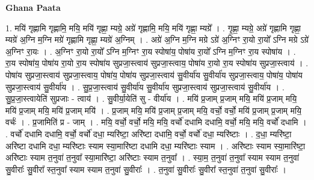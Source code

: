 \documentclass[17pt]{extarticle}
\begin{document}
\textbf{Ghana Paata } \newline

1. मयि॑ गृह्णामि गृह्णामि॒ मयि॒ मयि॑ गृह्णा॒ म्यग्रे॒ अग्रे॑ गृह्णामि॒ मयि॒ मयि॑ गृह्णा॒ म्यग्रे᳚ । . गृ॒ह्णा॒ म्यग्रे॒ अग्रे॑ गृह्णामि गृह्णा॒ म्यग्रे॑ अ॒ग्नि म॒ग्नि मग्रे॑ गृह्णामि गृह्णा॒ म्यग्रे॑ अ॒ग्निम् । . अग्रे॑ अ॒ग्नि म॒ग्नि मग्रे ऽग्रे॑ अ॒ग्निꣳ रा॒यो रा॒यो᳚ ऽग्नि मग्रे ऽग्रे॑ अ॒ग्निꣳ रा॒यः । . अ॒ग्निꣳ रा॒यो रा॒यो᳚ ऽग्नि म॒ग्निꣳ रा॒य स्पोषा॑य॒ पोषा॑य रा॒यो᳚ ऽग्नि म॒ग्निꣳ रा॒य स्पोषा॑य । . रा॒य स्पोषा॑य॒ पोषा॑य रा॒यो रा॒य स्पोषा॑य सुप्रजा॒स्त्वाय॑ सुप्रजा॒स्त्वाय॒ पोषा॑य रा॒यो रा॒य स्पोषा॑य सुप्रजा॒स्त्वाय॑ । . पोषा॑य सुप्रजा॒स्त्वाय॑ सुप्रजा॒स्त्वाय॒ पोषा॑य॒ पोषा॑य सुप्रजा॒स्त्वाय॑ सु॒वीर्या॑य सु॒वीर्या॑य सुप्रजा॒स्त्वाय॒ पोषा॑य॒ पोषा॑य सुप्रजा॒स्त्वाय॑ सु॒वीर्या॑य । . सु॒प्र॒जा॒स्त्वाय॑ सु॒वीर्या॑य सु॒वीर्या॑य सुप्रजा॒स्त्वाय॑ सुप्रजा॒स्त्वाय॑ सु॒वीर्या॑य । . सु॒प्र॒जा॒स्त्वायेति॑ सुप्रजाः - त्वाय॑ । . सु॒वीर्या॒येति॑ सु - वीर्या॑य । . मयि॑ प्र॒जाम् प्र॒जाम् मयि॒ मयि॑ प्र॒जाम् मयि॒ मयि॑ प्र॒जाम् मयि॒ मयि॑ प्र॒जाम् मयि॑ । . प्र॒जाम् मयि॒ मयि॑ प्र॒जाम् प्र॒जाम् मयि॒ वर्चो॒ वर्चो॒ मयि॑ प्र॒जाम् प्र॒जाम् मयि॒ वर्चः॑ । . प्र॒जामिति॑ प्र - जाम् । . मयि॒ वर्चो॒ वर्चो॒ मयि॒ मयि॒ वर्चो॑ दधामि दधामि॒ वर्चो॒ मयि॒ मयि॒ वर्चो॑ दधामि । . वर्चो॑ दधामि दधामि॒ वर्चो॒ वर्चो॑ दधा॒ म्यरि॑ष्टा॒ अरि॑ष्टा दधामि॒ वर्चो॒ वर्चो॑ दधा॒ म्यरि॑ष्टाः । . द॒धा॒ म्यरि॑ष्टा॒ अरि॑ष्टा दधामि दधा॒ म्यरि॑ष्टाः स्याम स्या॒मारि॑ष्टा दधामि दधा॒ म्यरि॑ष्टाः स्याम । . अरि॑ष्टाः स्याम स्या॒मारि॑ष्टा॒ अरि॑ष्टाः स्याम त॒नुवा॑ त॒नुवा᳚ स्या॒मारि॑ष्टा॒ अरि॑ष्टाः स्याम त॒नुवा᳚ । . स्या॒म॒ त॒नुवा॑ त॒नुवा᳚ स्याम स्याम त॒नुवा॑ सु॒वीराः᳚ सु॒वीरा᳚ स्त॒नुवा᳚ स्याम स्याम त॒नुवा॑ सु॒वीराः᳚ । . त॒नुवा॑ सु॒वीराः᳚ सु॒वीरा᳚ स्त॒नुवा॑ त॒नुवा॑ सु॒वीराः᳚ । \newline
\end{document}
